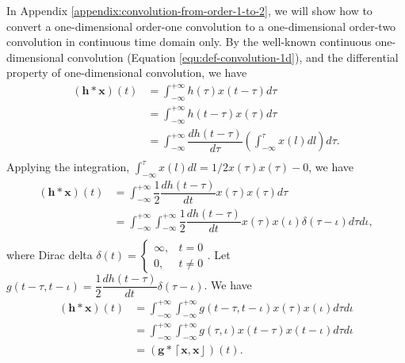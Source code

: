 \documentclass[twoside,11pt]{article}
\def\tvar#1{\mathbf{#1}} %
\def\intinf{\int_{-\infty}^{+\infty}\!}
\def\iintinf{\int_{-\infty}^{+\infty}\!\!\!\int_{-\infty}^{+\infty}\!}
\def\lcerfl#1{\left\lceil{#1}\right\rfloor}
\begin{document}
  In Appendix \ref{appendix:convolution-from-order-1-to-2}, we will show how to convert a one-dimensional order-one convolution to a one-dimensional order-two convolution in continuous time domain only.
  By the well-known continuous one-dimensional convolution (Equation \ref{equ:def-convolution-1d}), and the differential property of one-dimensional convolution, we have
  \begin{equation*}
    \begin{aligned}
      \left(\tvar{h} * \tvar{x}\right)(t)
       & = \intinf h(\tau) x(t - \tau) d \tau                                                         \\
       & = \intinf h(t - \tau) x(\tau) d \tau                                                         \\
       & = \intinf \dfrac{d h(t - \tau)}{d \tau} \left(\int_{-\infty}^{\tau} x(l) d l \right) d \tau. \\
    \end{aligned}
  \end{equation*}
  Applying the integration, \(\int_{-\infty}^{\tau} x(l) d l = 1/2 x(\tau) x(\tau) - 0\), we have
  \begin{equation*}
    \begin{aligned}
      \left(\tvar{h} * \tvar{x}\right)(t)
       & = \intinf \dfrac{1}{2} \dfrac{d h(t - \tau)}{d t} x(\tau) x(\tau) d \tau                                 \\
       & = \iintinf \dfrac{1}{2} \dfrac{d h(t - \tau)}{d t} x(\tau) x(\iota) \delta(\tau - \iota) d \tau d \iota, \\
    \end{aligned}
  \end{equation*}
  where Dirac delta \(\delta(t) = \left\{\begin{array}{lc}
    \infty, & t = 0   \\
    0,      & t \ne 0
  \end{array}\right.\). Let \(g(t - \tau, t - \iota) = \dfrac{1}{2} \dfrac{d h(t - \tau)}{d t} \delta(\tau - \iota)\). We have
  \begin{equation*}
    \begin{aligned}
      \left(\tvar{h} * \tvar{x}\right)(t)
       & = \iintinf g(t - \tau, t - \iota) x(\tau) x(\iota) d \tau d \iota \\
       & = \iintinf g(\tau, \iota) x(t - \tau) x(t - \iota) d \tau d \iota \\
       & = \left(\tvar{g} * \lcerfl{\tvar{x}, \tvar{x}}\right)(t).
    \end{aligned}
  \end{equation*}
\end{document}
